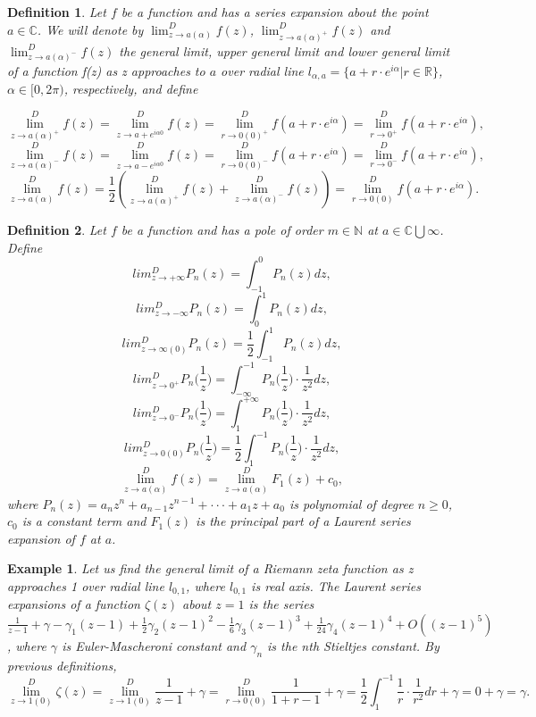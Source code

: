 \documentclass[12pt]{article}
\def\N{{\mathbb N}}
\def\R{{\mathbb R}}
\def\Co{{\mathbb C}}
\newtheorem{de}{Definition}[section]
\newtheorem{ex}{Example}[section]
\begin{document}
\begin{de}
Let $f$ be a function and has a series expansion about the point $a\in\Co$. We will denote by $\lim^D_{z\to a(\alpha)}f(z)$, $\lim^D_{z\to a(\alpha)^+}f(z)$ and $\lim^D_{z\to a(\alpha)^-}f(z)$ the general limit, upper general limit and lower general limit  of a function f(z) as z approaches to $a$ over radial line $l_{\alpha,a}=\{a+r\cdot e^{i\alpha}|r\in \R\}$, $\alpha\in[0,2\pi)$, respectively, and define

$$\lim^D_{z\to a(\alpha)^+}f(z)=\lim^D_{z\to a+e^{i\alpha 0}}f(z)=\lim^D_{r\to 0(0)^+}f(a+r\cdot e^{i\alpha})=\lim^D_{r\to 0^+}f(a+r\cdot e^{i\alpha}),$$ 
$$\lim^D_{z\to a(\alpha)^-}f(z)=\lim^D_{z\to a-e^{i\alpha 0}}f(z)=\lim^D_{r\to 0(0)^-}f(a+r\cdot e^{i\alpha})=\lim^D_{r\to 0^-}f(a+r\cdot e^{i\alpha}),$$ 
$$\lim^D_{z\to a(\alpha)}f(z)=\frac{1}{2}(\lim^D_{z\to a(\alpha)^+}f(z)+\lim^D_{z\to a(\alpha)^-}f(z))=\lim^D_{r\to 0(0)}f(a+r\cdot e^{i\alpha}).$$
\end{de}

\begin{de}
Let $f$ be a function and has a pole of order $m\in \N$ at $a \in \Co\bigcup\infty$. Define 
$$ lim_{z\to +\infty}^D P_n(z)=\int_{-1}^0 P_n(z) dz,$$ 
$$lim_{z\to -\infty}^D P_n(z)=\int_0^1 P_n(z) dz,$$  
$$lim_{z\to \infty(0)}^D P_n(z)=\frac{1}{2}\int_{-1}^1 P_n(z) dz,$$ 
$$ lim_{z\to 0^{+}}^D P_n\Big(\frac{1}{z}\Big)=\int_{-\infty}^{-1} P_n\Big(\frac{1}{z}\Big)\cdot\frac{1}{z^2} dz,$$ $$lim_{z\to 0^{-}}^D P_n\Big(\frac{1}{z}\Big)=\int_1^{+\infty} P_n\Big(\frac{1}{z}\Big)\cdot\frac{1}{z^2} dz,$$  $$lim_{z\to 0(0)}^D P_n\Big(\frac{1}{z}\Big)=\frac{1}{2}\int_{1}^{-1} P_n\Big(\frac{1}{z}\Big)\cdot\frac{1}{z^2} dz,$$ 
$$\lim_{z\to a(\alpha)}^{D}f(z)=\lim_{z\to a(\alpha)}^{D} F_1(z)+c_0,$$ 
where $P_n(z)=a_nz^n+a_{n-1}z^{n-1}+\cdot \cdot \cdot +a_1z+a_0$ is polynomial of degree $n\geq 0$, $c_0$ is a constant term and $F_1(z)$ is the principal part of a Laurent series expansion of $f$ at $a$.
\end{de}

\begin{ex}
Let us find the general limit of a Riemann zeta function as z approaches 1 over radial line $l_{0, 1}$, where $l_{0, 1}$ is  real axis. The Laurent series expansions of a function $\zeta(z)$ about $z=1$ is the series $\frac{1}{z-1}+\gamma-\gamma_1(z-1)+\frac{1}{2}\gamma_2(z-1)^2-\frac{1}{6}\gamma_3(z-1)^3+\frac{1}{24}\gamma _4(z-1)^4+O((z-1)^5)$, where $\gamma$ is Euler-Mascheroni constant and $\gamma_n$ is the nth Stieltjes constant. By previous definitions, $$\lim_{z\to 1(0)}^D \zeta(z)=\lim_{z\to 1(0)}^D\frac{1}{z-1}+\gamma=\lim_{r\to 0(0)}^D\frac{1}{1+r-1}+\gamma=\frac{1}{2}\int_{1}^{-1} \frac{1}{r}\cdot\frac{1}{r^2} dr+\gamma=0+\gamma=\gamma.$$
\end{ex}
\end{document}
